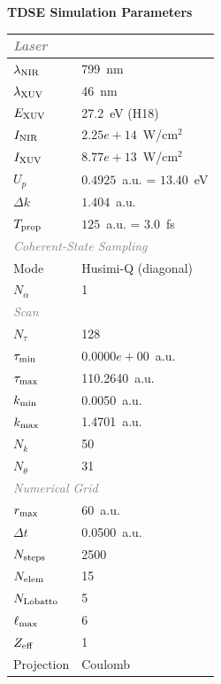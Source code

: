 \documentclass[11pt]{article}
\begin{document}

\begin{center}
  \Large\textbf{TDSE Simulation Parameters}
\end{center}
\vspace{4pt}

\begin{tabular}{@{}ll@{}}
  \toprule
  \multicolumn{2}{l}{\small\textit{\textcolor{gray}{Laser}}} \\
  \hline
  $\lambda_{\rm NIR}$ & 799~nm \\
  $\lambda_{\rm XUV}$ & 46~nm \\
  $E_{\rm XUV}$ & 27.2~eV (H18) \\
  $I_{\rm NIR}$ & $2.25e+14$~W/cm$^2$ \\
  $I_{\rm XUV}$ & $8.77e+13$~W/cm$^2$ \\
  $U_p$ & $0.4925$~a.u. = $13.40$~eV \\
  $\Delta k$ & $1.404$~a.u. \\
  $T_{\rm prop}$ & $125$~a.u. = $3.0$~fs \\
  \multicolumn{2}{l}{\small\textit{\textcolor{gray}{Coherent-State Sampling}}} \\
  \hline
  Mode & Husimi-Q (diagonal) \\
  $N_{\alpha}$ & 1 \\
  \multicolumn{2}{l}{\small\textit{\textcolor{gray}{Scan}}} \\
  \hline
  $N_{\tau}$ & 128 \\
  $\tau_{\rm min}$ & $0.0000e+00$~a.u. \\
  $\tau_{\rm max}$ & 110.2640~a.u. \\
  $k_{\rm min}$ & 0.0050~a.u. \\
  $k_{\rm max}$ & 1.4701~a.u. \\
  $N_k$ & 50 \\
  $N_{\theta}$ & 31 \\
  \multicolumn{2}{l}{\small\textit{\textcolor{gray}{Numerical Grid}}} \\
  \hline
  $r_{\rm max}$ & 60~a.u. \\
  $\Delta t$ & 0.0500~a.u. \\
  $N_{\rm steps}$ & 2500 \\
  $N_{\rm elem}$ & 15 \\
  $N_{\rm Lobatto}$ & 5 \\
  $\ell_{\rm max}$ & 6 \\
  $Z_{\rm eff}$ & 1 \\
  Projection & Coulomb \\
  \bottomrule
\end{tabular}
\end{document}
